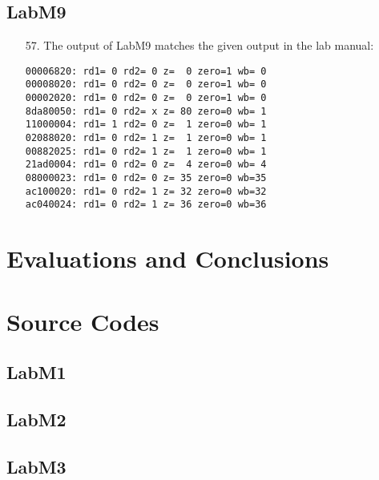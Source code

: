 \documentclass{article}
\begin{document}
\subsection{LabM9}
\begin{enumerate}
\item[57. ] The output of LabM9 matches the given output in the lab manual:
\begin{verbatim}
00006820: rd1= 0 rd2= 0 z=  0 zero=1 wb= 0
00008020: rd1= 0 rd2= 0 z=  0 zero=1 wb= 0
00002020: rd1= 0 rd2= 0 z=  0 zero=1 wb= 0
8da80050: rd1= 0 rd2= x z= 80 zero=0 wb= 1
11000004: rd1= 1 rd2= 0 z=  1 zero=0 wb= 1
02088020: rd1= 0 rd2= 1 z=  1 zero=0 wb= 1
00882025: rd1= 0 rd2= 1 z=  1 zero=0 wb= 1
21ad0004: rd1= 0 rd2= 0 z=  4 zero=0 wb= 4
08000023: rd1= 0 rd2= 0 z= 35 zero=0 wb=35
ac100020: rd1= 0 rd2= 1 z= 32 zero=0 wb=32
ac040024: rd1= 0 rd2= 1 z= 36 zero=0 wb=36
\end{verbatim}
\end{enumerate}


\section{Evaluations and Conclusions}



\section{Source Codes}

\subsection{LabM1}


\subsection{LabM2}


\subsection{LabM3}

\end{document}
